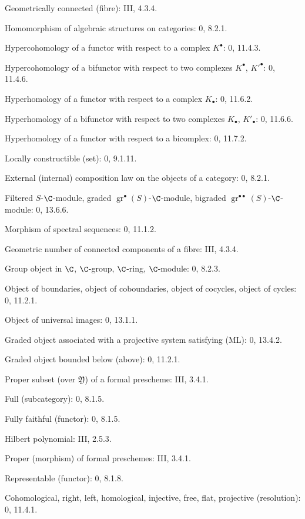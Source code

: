 \begin{flushleft}
Geometrically connected (fibre): III, 4.3.4.

Homomorphism of algebraic structures on categories: 0, 8.2.1.

Hypercohomology of a functor with respect to a complex $K^\bullet$:
0, 11.4.3.

Hypercohomology of a bifunctor with respect to two complexes
$K^\bullet$, $K'^{\bullet}$: 0, 11.4.6.

Hyperhomology of a functor with respect to a complex $K_\bullet$:
0, 11.6.2.

Hyperhomology of a bifunctor with respect to two complexes $K_\bullet$,
$K'_\bullet$: 0, 11.6.6.

Hyperhomology of a functor with respect to a bicomplex: 0, 11.7.2.

Locally constructible (set): 0, 9.1.11.

External (internal) composition law on the objects of a category: 0, 8.2.1.


Filtered $S$-$\C$-module, graded $\operatorname{gr}^\bullet(S)$-$\C$-module,
bigraded $\operatorname{gr}^{\bullet\bullet}(S)$-$\C$-module: 0, 13.6.6.

Morphism of spectral sequences: 0, 11.1.2.

Geometric number of connected components of a fibre: III, 4.3.4.

Group object in $\C$, $\C$-group, $\C$-ring, $\C$-module: 0, 8.2.3.

Object of boundaries, object of coboundaries, object of cocycles, object of
cycles: 0, 11.2.1.

Object of universal images: 0, 13.1.1.

Graded object associated with a projective system satisfying (ML): 0, 13.4.2.

Graded object bounded below (above): 0, 11.2.1.

Proper subset (over $\mathfrak Y$) of a formal prescheme: III, 3.4.1.

Full (subcategory): 0, 8.1.5.

Fully faithful (functor): 0, 8.1.5.

Hilbert polynomial: III, 2.5.3.

Proper (morphism) of formal preschemes: III, 3.4.1.

Representable (functor): 0, 8.1.8.

Cohomological, right, left, homological, injective, free, flat, projective
(resolution): 0, 11.4.1.


\end{flushleft}
